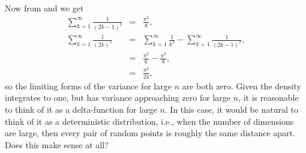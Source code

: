 Now from \cite[0.234,2.(p.7)]{GandR} and \cite[0.233,3.(p.7)]{GandR}  we get
\begin{eqnarray}
  \sum_{k=1}^{\infty} \frac{1}{(2k-1)^2} & = & \frac{\pi^2}{8},  \\
  \sum_{k=1}^{\infty} \frac{1}{(2k)^2}
           & = &  \sum_{k=1}^{\infty} \frac{1}{k^2} - \sum_{k=1}^{\infty} \frac{1}{(2k-1)^2}, \nonumber \\
           & = & \frac{\pi^2}{6}  - \frac{\pi^2}{8}  , \nonumber \\
           & = & \frac{\pi^2}{24} ,
\end{eqnarray}
so the limiting forms of the variance for large $n$ are both
zero. Given the density integrates to one, but has variance
approaching zero for large $n$, it is reasonable to think of it as a
delta-function for large $n$. In this case, it would be natural to
think of it as a deterministic distribution, i.e., when the number of
dimensions are large, then every pair of random points is roughly the
same distance apart. Does this make sense at all?

%   




